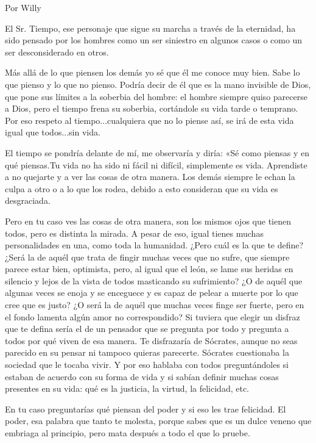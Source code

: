 \documentclass[11pt,twoside,openright,a5paper]{book}
\begin{document}
                                                                                   \begin{flushright}Por Willy\end{flushright}

El Sr. Tiempo, ese personaje que sigue su marcha a través de la eternidad, ha sido pensado por los hombres como un ser siniestro en algunos casos o como un ser desconsiderado en otros. 

Más allá de lo que piensen los demás yo sé que él me conoce muy bien. Sabe lo que pienso y lo que no pienso. Podría decir de él que es la mano invisible de Dios, que pone sus límites a la soberbia del hombre: el hombre siempre quiso parecerse a Dios, pero el tiempo frena su soberbia, cortándole su vida tarde o temprano. Por eso respeto al tiempo...cualquiera que no lo piense así, se irá de esta vida igual que todos...sin vida.

El tiempo se pondría delante de mí, me observaría y diría: «Sé como piensas y en qué piensas.Tu vida no ha sido ni fácil ni difícil, simplemente es vida. Aprendiste a no quejarte y a ver las cosas de otra manera. Los demás siempre le echan la culpa a otro o a lo que los rodea, debido a esto consideran que su vida es desgraciada.

Pero en tu caso ves las cosas de otra manera, son los mismos ojos que tienen todos, pero es distinta la mirada. A pesar de eso, igual tienes muchas personalidades en una, como toda la humanidad. ¿Pero cuál es la que te define? ¿Será la de aquél que trata de fingir muchas veces que no sufre, que siempre parece estar bien, optimista, pero, al igual que el león, se lame sus heridas en silencio y lejos de la vista de todos masticando su sufrimiento? ¿O de aquél que algunas veces se enoja y se enceguece y es capaz de pelear a muerte por lo que cree que es justo? ¿O será la de aquél que muchas veces finge ser fuerte, pero en el fondo lamenta algún amor no correspondido? Si tuviera que elegir un disfraz que te defina sería el de un pensador que se pregunta por todo y pregunta a todos por qué viven de esa manera. Te disfrazaría de Sócrates, aunque no seas parecido en su pensar ni tampoco quieras parecerte. Sócrates cuestionaba la sociedad que le tocaba vivir. Y por eso hablaba con todos preguntándoles si estaban de acuerdo con su forma de vida y si sabían definir muchas cosas presentes en su vida: qué es la justicia, la virtud, la felicidad, etc.

En tu caso preguntarías qué piensan del poder y si eso les trae felicidad. El poder, esa palabra que tanto te molesta, porque sabes que es un dulce veneno que embriaga al principio, pero mata después a todo el que lo pruebe.
\end{document}

